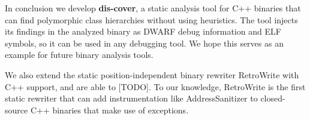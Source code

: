 \documentclass[a4paper,11pt,oneside]{report}
\begin{document}

In conclusion we develop \textbf{dis-cover}, a static analysis tool for C++
binaries that can find polymorphic class hierarchies without using heuristics.
The tool injects its findings in the analyzed binary as DWARF debug
information and ELF symbols, so it can be used in any debugging tool.
We hope this serves as an example for future binary analysis tools.

We also extend the static position-independent binary rewriter RetroWrite with
C++ support, and are able to [TODO].
To our knowledge, RetroWrite is the first static rewriter that can add
instrumentation like AddressSanitizer to closed-source C++ binaries that make
use of exceptions.

\cleardoublepage
{}
{}
\printbibliography

%
%
\end{document}
